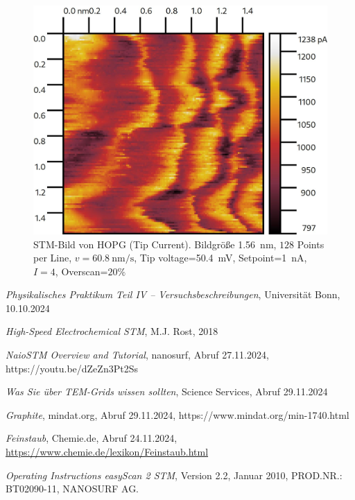 \documentclass{article}
\begin{document}
\begin{figure}[h]
    \begin{minipage}{0.49\textwidth}
        \centering
        \includegraphics[width=\textwidth]{Image20221.jpg}
        \caption{
            STM-Bild von HOPG (Tip Current). Bildgröße \SI{1.56}{\nm}, $128$ Points per Line,
            $v=\SI{60.8}{\nm\per\s}$, Tip voltage=\SI{50.4}{\mV}, Setpoint=\SI{1}{\nA}, $I=4$, Overscan=$20\%$
        }
        \label{fig:hopg-3}
    \end{minipage}
\end{figure}



\clearpage
\begin{thebibliography}{9}

\textit{Physikalisches Praktikum Teil IV -- Versuchsbeschreibungen}, Universität Bonn, 10.10.2024

\textit{High-Speed Electrochemical STM}, M.J. Rost, 2018

\textit{NaioSTM Overview and Tutorial}, nanosurf, Abruf 27.11.2024, https://youtu.be/dZeZn3Pt2Ss

\textit{Was Sie über TEM-Grids wissen sollten}, Science Services, Abruf 29.11.2024

\textit{Graphite}, mindat.org, Abruf 29.11.2024, https://www.mindat.org/min-1740.html

\textit{Feinstaub}, Chemie.de, Abruf 24.11.2024, \url{https://www.chemie.de/lexikon/Feinstaub.html}

\textit{Operating Instructions easyScan 2 STM}, Version 2.2, Januar 2010, PROD.NR.: BT02090-11, NANOSURF AG.


\end{thebibliography}
\end{document}
